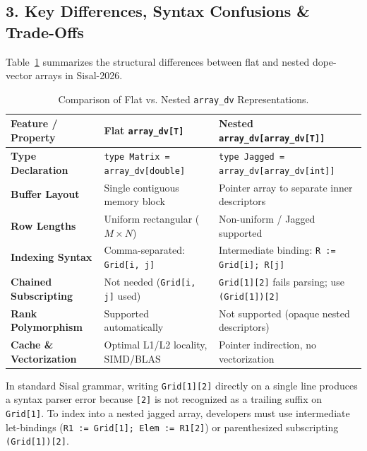 \subsection{3. Key Differences, Syntax Confusions \& Trade-Offs}

Table~\ref{tab:flat_vs_nested_array_dv} summarizes the structural differences between flat and nested dope-vector arrays in Sisal-2026.

\begin{table}[h!]
\centering
\small
\begin{tabularx}{\textwidth}{lXX}
\toprule
\textbf{Feature / Property} & \textbf{Flat \texttt{array\_dv[T]}} & \textbf{Nested \texttt{array\_dv[array\_dv[T]]}} \\
\midrule
\textbf{Type Declaration} & \texttt{type Matrix = array\_dv[double]} & \texttt{type Jagged = array\_dv[array\_dv[int]]} \\
\textbf{Buffer Layout} & Single contiguous memory block & Pointer array to separate inner descriptors \\
\textbf{Row Lengths} & Uniform rectangular ($M \times N$) & Non-uniform / Jagged supported \\
\textbf{Indexing Syntax} & Comma-separated: \texttt{Grid[i, j]} & Intermediate binding: \texttt{R := Grid[i]; R[j]} \\
\textbf{Chained Subscripting} & Not needed (\texttt{Grid[i, j]} used) & \texttt{Grid[1][2]} fails parsing; use \texttt{(Grid[1])[2]} \\
\textbf{Rank Polymorphism} & Supported automatically & Not supported (opaque nested descriptors) \\
\textbf{Cache \& Vectorization} & Optimal L1/L2 locality, SIMD/BLAS & Pointer indirection, no vectorization \\
\bottomrule
\end{tabularx}
\caption{Comparison of Flat vs. Nested \texttt{array\_dv} Representations.}
\label{tab:flat_vs_nested_array_dv}
\end{table}

\begin{tip}
In standard Sisal grammar, writing \texttt{Grid[1][2]} directly on a single line produces a syntax parser error because \texttt{[2]} is not recognized as a trailing suffix on \texttt{Grid[1]}. To index into a nested jagged array, developers must use intermediate let-bindings (\texttt{R1 := Grid[1]; Elem := R1[2]}) or parenthesized subscripting \texttt{(Grid[1])[2]}.
\end{tip}


